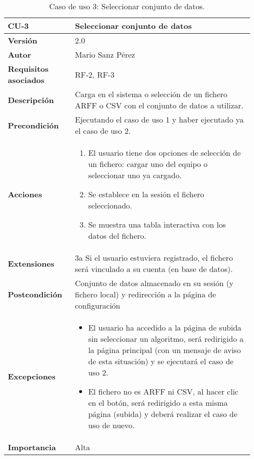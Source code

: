 \begin{table}[p]
	\centering
	\begin{tabularx}{\linewidth}{ p{} p{} }
		\toprule
		\textbf{CU-3}    & \textbf{Seleccionar conjunto de datos}\\
		\toprule
		\textbf{Versión}              & 2.0    \\
		\textbf{Autor}                & Mario Sanz Pérez \\
		\textbf{Requisitos asociados} & RF-2, RF-3 \\
		\textbf{Descripción}          & Carga en el sistema o selección de un fichero ARFF o CSV con el conjunto de datos a utilizar. \\
		\textbf{Precondición}         & Ejecutando el caso de uso 1 y haber ejecutado ya el caso de uso 2.\\
		\textbf{Acciones}             &
		\begin{enumerate}
			\def\labelenumi{\arabic{enumi}.}
			\tightlist
			\item El usuario tiene dos opciones de selección de un fichero: cargar uno del equipo o seleccionar uno ya cargado.
			\item Se establece en la sesión el fichero seleccionado.
			\item Se muestra una tabla interactiva con los datos del fichero.
		\end{enumerate}\\
		\textbf{Extensiones}          & 3a Si el usuario estuviera registrado, el fichero será vinculado a su cuenta (en base de datos). \\
		\textbf{Postcondición}        & Conjunto de datos almacenado en su sesión (y fichero local) y redirección a la página de configuración \\
		\textbf{Excepciones}          & \begin{itemize}
			\item El usuario ha accedido a la página de subida sin seleccionar un algoritmo, será redirigido a la página principal (con un mensaje de aviso de esta situación) y se ejecutará el caso de uso 2.
			\item El fichero no es ARFF ni CSV, al hacer clic en el botón, será redirigido a esta misma página (subida) y deberá realizar el caso de uso de nuevo.
		\end{itemize} \\
		\textbf{Importancia}          & Alta \\
		\bottomrule
	\end{tabularx}
	\caption{Caso de uso 3: Seleccionar conjunto de datos.}
\end{table}


